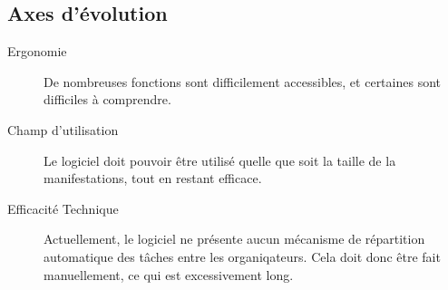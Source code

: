 \subsection{Axes d'évolution}
\begin{description}
 \item[Ergonomie] De nombreuses fonctions sont difficilement accessibles, et certaines sont difficiles à comprendre.
\item[Champ d'utilisation] Le logiciel doit pouvoir être utilisé quelle que soit la taille de la manifestations, tout en restant efficace.
\item[Efficacité Technique] Actuellement, le logiciel ne présente aucun mécanisme de répartition automatique des tâches entre les organiqateurs. Cela doit donc être fait manuellement, ce qui est excessivement long.
 
\end{description}